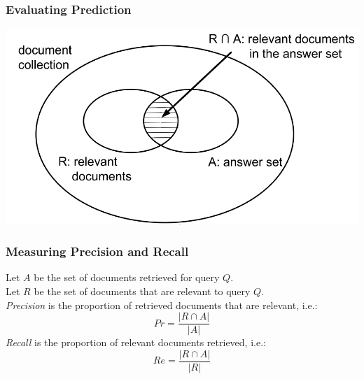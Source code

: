 \documentclass[svgnames]{beamer}
\begin{document}
\begin{frame}
  \frametitle{Evaluating Prediction}

  \begin{center}
    \includegraphics[width=1.0 \textwidth]{precision-recall}
  \end{center}
\end{frame}




\begin{frame}
  \frametitle{Measuring Precision and Recall}
  
  \begin{definition}
    Let $A$ be the set of documents retrieved for query $Q$. \\ 
    Let $R$ be the set of documents that are relevant to query $Q$.\\
    \emph{Precision} is the proportion of retrieved documents that are
    relevant, i.e.:
    \begin{displaymath}
      Pr = \frac{|R \cap A|}{|A|}
    \end{displaymath}
    \emph{Recall} is the proportion of relevant documents retrieved, i.e.:
    \begin{displaymath}
      Re = \frac{|R \cap A|}{|R|}
    \end{displaymath}
  \end{definition}
\end{frame}

\end{document}
